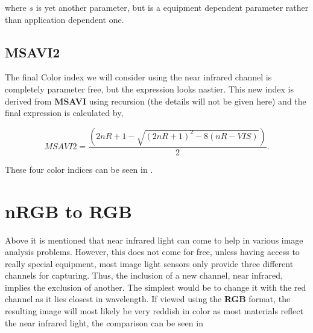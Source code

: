 where $s$ is yet another parameter, but is a equipment dependent parameter rather than application dependent one.

\subsection{MSAVI2}

The final Color index we will consider using the near infrared channel is completely parameter free, but the expression looks nastier. This new index is derived from \textbf{MSAVI} using recursion (the details will not be given here) and the final expression is calculated by,

\begin{equation}
    MSAVI2 = \frac{\left(2nR+1-\sqrt{\left(2nR+1\right)^2-8\left(nR-VIS\right)}\right)}{2}.
\end{equation}


These four color indices can be seen in .

\section{nRGB to RGB}

Above it is mentioned that near infrared light can come to help in various image analysis problems. However, this does not come for free, unless having access to really special equipment, most image light sensors only provide three different channels for capturing. Thus, the inclusion of a new channel, near infrared, implies the exclusion of another. The simplest would be to change it with the red channel as it lies closest in wavelength. If viewed using the \textbf{RGB} format, the resulting image will most likely be very reddish in color as most materials reflect the near infrared light, the comparison can be seen in 


